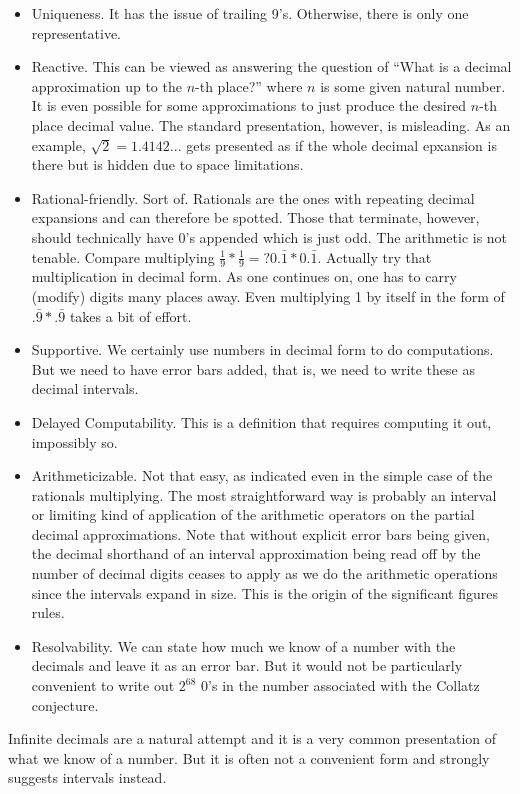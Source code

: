 \documentclass[12pt]{article}
\begin{document}
\begin{itemize}
    \item Uniqueness. It has the issue of trailing 9's. Otherwise, there is only one representative. 
    \item Reactive. This can be viewed as answering the question of ``What is a decimal approximation up to the $n$-th place?'' where $n$ is some given natural number. It is even possible for some approximations to just produce the desired $n$-th place decimal value. The standard presentation, however, is misleading. As an example, $\sqrt{2} = 1.4142...$ gets presented as if the whole decimal epxansion is there but is hidden due to space limitations. 
    \item Rational-friendly. Sort of. Rationals are the ones with repeating decimal expansions and can therefore be spotted. Those that terminate, however, should technically have 0's appended which is just odd. The arithmetic is not tenable. Compare multiplying $\tfrac{1}{9}*\tfrac{1}{9} =? 0.\bar{1} * 0.\bar{1}$. Actually try that multiplication in decimal form. As one continues on, one has to carry (modify) digits many places away. Even multiplying 1 by itself in the form of $.\bar{9}*.\bar{9}$ takes a bit of effort. 
    \item Supportive. We certainly use numbers in decimal form to do computations. But we need to have error bars added, that is, we need to write these as decimal intervals. 
    \item Delayed Computability. This is a definition that requires computing it out, impossibly so. 
    \item Arithmeticizable. Not that easy, as indicated even in the simple case of the rationals multiplying. The most straightforward way is probably an interval or limiting kind of application of the arithmetic operators on the partial decimal approximations. Note that without explicit error bars being given, the decimal shorthand of an interval approximation being read off by the number of decimal digits ceases to apply as we do the arithmetic operations since the intervals expand in size. This is the origin of the significant figures rules. 
    \item Resolvability. We can state how much we know of a number with the decimals and leave it as an error bar. But it would not be particularly convenient to write out $2^{68}$ 0's in the number associated with the Collatz conjecture. 
\end{itemize}

Infinite decimals are a natural attempt and it is a very common presentation of what we know of a number. But it is often not a convenient form and strongly suggests intervals instead. 
\end{document}
